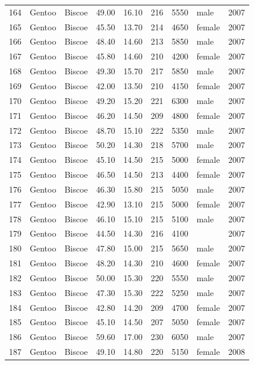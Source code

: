 \documentclass{article}\usepackage[]{graphicx}\usepackage[]{xcolor}
\begin{document}
\begin{table}[ht]
\begin{tabular}{rllrrrrlr}
  164 & Gentoo & Biscoe & 49.00 & 16.10 & 216 & 5550 & male & 2007 \\ 
  165 & Gentoo & Biscoe & 45.50 & 13.70 & 214 & 4650 & female & 2007 \\ 
  166 & Gentoo & Biscoe & 48.40 & 14.60 & 213 & 5850 & male & 2007 \\ 
  167 & Gentoo & Biscoe & 45.80 & 14.60 & 210 & 4200 & female & 2007 \\ 
  168 & Gentoo & Biscoe & 49.30 & 15.70 & 217 & 5850 & male & 2007 \\ 
  169 & Gentoo & Biscoe & 42.00 & 13.50 & 210 & 4150 & female & 2007 \\ 
  170 & Gentoo & Biscoe & 49.20 & 15.20 & 221 & 6300 & male & 2007 \\ 
  171 & Gentoo & Biscoe & 46.20 & 14.50 & 209 & 4800 & female & 2007 \\ 
  172 & Gentoo & Biscoe & 48.70 & 15.10 & 222 & 5350 & male & 2007 \\ 
  173 & Gentoo & Biscoe & 50.20 & 14.30 & 218 & 5700 & male & 2007 \\ 
  174 & Gentoo & Biscoe & 45.10 & 14.50 & 215 & 5000 & female & 2007 \\ 
  175 & Gentoo & Biscoe & 46.50 & 14.50 & 213 & 4400 & female & 2007 \\ 
  176 & Gentoo & Biscoe & 46.30 & 15.80 & 215 & 5050 & male & 2007 \\ 
  177 & Gentoo & Biscoe & 42.90 & 13.10 & 215 & 5000 & female & 2007 \\ 
  178 & Gentoo & Biscoe & 46.10 & 15.10 & 215 & 5100 & male & 2007 \\ 
  179 & Gentoo & Biscoe & 44.50 & 14.30 & 216 & 4100 &  & 2007 \\ 
  180 & Gentoo & Biscoe & 47.80 & 15.00 & 215 & 5650 & male & 2007 \\ 
  181 & Gentoo & Biscoe & 48.20 & 14.30 & 210 & 4600 & female & 2007 \\ 
  182 & Gentoo & Biscoe & 50.00 & 15.30 & 220 & 5550 & male & 2007 \\ 
  183 & Gentoo & Biscoe & 47.30 & 15.30 & 222 & 5250 & male & 2007 \\ 
  184 & Gentoo & Biscoe & 42.80 & 14.20 & 209 & 4700 & female & 2007 \\ 
  185 & Gentoo & Biscoe & 45.10 & 14.50 & 207 & 5050 & female & 2007 \\ 
  186 & Gentoo & Biscoe & 59.60 & 17.00 & 230 & 6050 & male & 2007 \\ 
  187 & Gentoo & Biscoe & 49.10 & 14.80 & 220 & 5150 & female & 2008 \\ 

\end{tabular}
\end{table}
\end{document}
